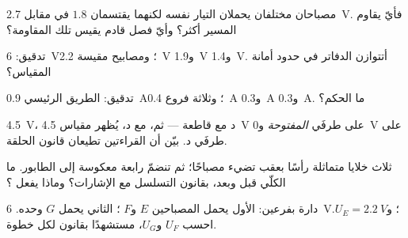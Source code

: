 \begin{exercise}[$\star$]\label{exo:g8:circuit-laws:6}
مصباحان مختلفان  يحملان التيار نفسه لكنهما يقتسمان
 $1.8$ في مقابل \qty{2.7}{V}. فأيّ  يقاوم المسير
أكثر؟ وأيّ فصل قادم يقيس تلك المقاومة؟
\end{exercise}

\begin{exercise}[$\star$]\label{exo:g8:circuit-laws:7}
تدقيق:  \qty{6}{V}؛ ومصابيح  مقيسة
\qty{2.2}{V} و\qty{1.9}{V} و\qty{1.4}{V}. أتتوازن الدفاتر في
حدود أمانة المقياس؟
\end{exercise}

\begin{exercise}[$\star$]\label{exo:g8:circuit-laws:8}
تدقيق: الطريق الرئيسي \qty{0.9}{A}؛ وثلاثة فروع \qty{0.4}{A}
و\qty{0.3}{A} و\qty{0.3}{A}. ما الحكم؟
\end{exercise}

\begin{exercise}[$\star\star$]\label{exo:g8:circuit-laws:9}
 \qty{4.5}{V}،  د  مع قاطعة --- ثم،
 مع  د، يُظهر مقياس  \qty{4.5}{V} على
طرفَي  \emph{المفتوحة} و\qty{0}{V} على طرفَي د. بيّن أن
القراءتين تطيعان قانون  الحلقة.
\end{exercise}

\begin{exercise}[$\star\star$]\label{exo:g8:circuit-laws:10}
ثلاث خلايا متماثلة رأسًا بعقب تضيء مصباحًا؛ ثم تنضمّ رابعة
معكوسة إلى الطابور. ما  الكلّي قبل وبعد، بقانون التسلسل
مع الإشارات؟ وماذا يفعل ؟
\end{exercise}

\begin{exercise}[$\star\star$]\label{exo:g8:circuit-laws:11}
دارة بفرعين:  الأول يحمل المصباحين $E$ و$F$ ؛
 الثاني يحمل  $G$ وحده.  \qty{6}{V}؛
و$U_E = \qty{2.2}{V}$. احسب $U_F$ و$U_G$، مستشهدًا بقانون لكل
خطوة.
\end{exercise}

